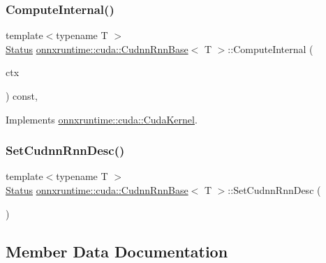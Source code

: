 \subsubsection{\texorpdfstring{Compute\+Internal()}{ComputeInternal()}}
{\footnotesize\ttfamily template$<$typename T $>$ \\
\mbox{\hyperlink{classonnxruntime_1_1common_1_1Status}{Status}} \mbox{\hyperlink{classonnxruntime_1_1cuda_1_1CudnnRnnBase}{onnxruntime\+::cuda\+::\+Cudnn\+Rnn\+Base}}$<$ T $>$\+::Compute\+Internal (\begin{DoxyParamCaption}\item[{\mbox{\hyperlink{classonnxruntime_1_1OpKernelContext}{Op\+Kernel\+Context}} $\ast$}]{ctx }\end{DoxyParamCaption}) const\hspace{0.3cm}{\ttfamily [override]}, {\ttfamily [virtual]}}



Implements \mbox{\hyperlink{classonnxruntime_1_1cuda_1_1CudaKernel_aca7af04ae448017d6023d30bba231ebb}{onnxruntime\+::cuda\+::\+Cuda\+Kernel}}.

\mbox{\label{classonnxruntime_1_1cuda_1_1CudnnRnnBase_acf8e4d67f6937aef141fee74b5d8401a}} 
\subsubsection{\texorpdfstring{Set\+Cudnn\+Rnn\+Desc()}{SetCudnnRnnDesc()}}
{\footnotesize\ttfamily template$<$typename T $>$ \\
\mbox{\hyperlink{classonnxruntime_1_1common_1_1Status}{Status}} \mbox{\hyperlink{classonnxruntime_1_1cuda_1_1CudnnRnnBase}{onnxruntime\+::cuda\+::\+Cudnn\+Rnn\+Base}}$<$ T $>$\+::Set\+Cudnn\+Rnn\+Desc (\begin{DoxyParamCaption}{ }\end{DoxyParamCaption})}



\subsection{Member Data Documentation}
\mbox{\label{classonnxruntime_1_1cuda_1_1CudnnRnnBase_a356775ca69710062927763d8caf012fc}} 
